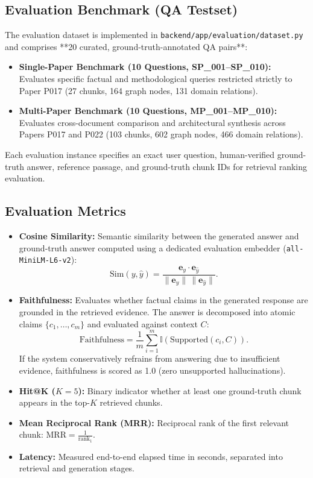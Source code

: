 \documentclass[conference]{IEEEtran}
\begin{document}
\subsection{Evaluation Benchmark (QA Testset)}
The evaluation dataset is implemented in \texttt{backend/app/evaluation/dataset.py} and comprises **20 curated, ground-truth-annotated QA pairs**:
\begin{itemize}
\item \textbf{Single-Paper Benchmark (10 Questions, SP\_001--SP\_010):} Evaluates specific factual and methodological queries restricted strictly to Paper P017 (27 chunks, 164 graph nodes, 131 domain relations).
\item \textbf{Multi-Paper Benchmark (10 Questions, MP\_001--MP\_010):} Evaluates cross-document comparison and architectural synthesis across Papers P017 and P022 (103 chunks, 602 graph nodes, 466 domain relations).
\end{itemize}
Each evaluation instance specifies an exact user question, human-verified ground-truth answer, reference passage, and ground-truth chunk IDs for retrieval ranking evaluation.

\subsection{Evaluation Metrics}
\begin{itemize}
\item \textbf{Cosine Similarity:} Semantic similarity between the generated answer and ground-truth answer computed using a dedicated evaluation embedder (\texttt{all-MiniLM-L6-v2}):
\begin{equation}
\text{Sim}(y, \hat{y}) = \frac{\mathbf{e}_y \cdot \mathbf{e}_{\hat{y}}}{\|\mathbf{e}_y\|\,\|\mathbf{e}_{\hat{y}}\|}.
\end{equation}
\item \textbf{Faithfulness:} Evaluates whether factual claims in the generated response are grounded in the retrieved evidence. The answer is decomposed into atomic claims $\{c_1, \dots, c_m\}$ and evaluated against context $C$:
\begin{equation}
\text{Faithfulness} = \frac{1}{m}\sum_{i=1}^m \mathbb{I}(\text{Supported}(c_i, C)).
\end{equation}
If the system conservatively refrains from answering due to insufficient evidence, faithfulness is scored as 1.0 (zero unsupported hallucinations).
\item \textbf{Hit@K ($K=5$):} Binary indicator whether at least one ground-truth chunk appears in the top-$K$ retrieved chunks.
\item \textbf{Mean Reciprocal Rank (MRR):} Reciprocal rank of the first relevant chunk: $\text{MRR} = \frac{1}{\text{rank}_1}$.
\item \textbf{Latency:} Measured end-to-end elapsed time in seconds, separated into retrieval and generation stages.
\end{itemize}
\end{document}
